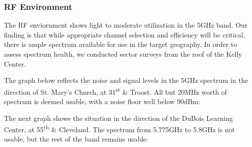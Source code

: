 \subsubsection{RF Environment}
The RF enviornment shows light to moderate utilization in the 5GHz band. Our
finding is that while appropriate channel selection and efficiency will be critical,
there is ample spectrum available for use in the target geography. In order to
assess spectrum health, we conducted sector surveys from the roof of the Kelly Center. \par
The graph below reflects the noise and signal levels in the 5GHz spectrum in the direction
of St. Mary's Church, at 31\textsuperscript{st} \& Troost. All but 20MHz worth of spectrum
is deemed usable, with a noise floor well below 90dBm:
\begin{center}
\end{center}
The next graph shows the situation in the direction of the DuBois Learning Center, at 
55\textsuperscript{th} \& Cleveland. The spectrum from 5.775GHz to 5.8GHz is not usable, but the rest of the band remains usable:
\begin{center}
\end{center}
